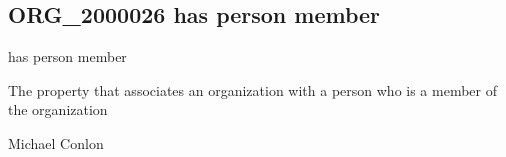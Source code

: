 \documentclass[letterpaper,10pt,english]{sphinxmanual}
\begin{document}
\subsection{ORG\_2000026 \sphinxhyphen{} has person member}
\label{\detokenize{doc-ORG_2000026:org-2000026-has-person-member}}\label{\detokenize{doc-ORG_2000026:index-0}}\label{\detokenize{doc-ORG_2000026::doc}}
\begin{sphinxShadowBox}

\sphinxAtStartPar
has person member
\end{sphinxShadowBox}

\begin{sphinxShadowBox}

\sphinxAtStartPar
{}
\end{sphinxShadowBox}

\begin{sphinxShadowBox}

\sphinxAtStartPar
The property that associates an organization with a person who is  a member of the organization
\end{sphinxShadowBox}

\begin{sphinxShadowBox}

\sphinxAtStartPar
Michael Conlon 
\end{sphinxShadowBox}

\begin{sphinxShadowBox}

\sphinxAtStartPar
{\hyperref[\detokenize{doc-ORG_0000001::doc}]{}}
\end{sphinxShadowBox}

\begin{sphinxShadowBox}

\sphinxAtStartPar
{\hyperref[\detokenize{doc-NCBITaxon_9606::doc}]{}}
\end{sphinxShadowBox}

\begin{sphinxShadowBox}

\sphinxAtStartPar
{\hyperref[\detokenize{doc-ORG_2000027::doc}]{}}
\end{sphinxShadowBox}
\end{document}
